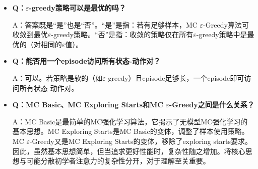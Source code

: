 \documentclass[UTF8]{article}
\begin{document}
\begin{itemize}
    \item \textbf{Q：$\varepsilon$-greedy策略可以是最优的吗？}

    A：答案既是“是”也是“否”。“是”是指：若有足够样本，MC $\varepsilon$-Greedy算法可收敛到最优$\varepsilon$-greedy策略。“否”是指：收敛的策略仅在所有$\varepsilon$-greedy策略中是最优的（对相同的$\varepsilon$值）。

    \item \textbf{Q：能否用一个episode访问所有状态-动作对？}

    A：可以。若策略是软的（如$\varepsilon$-greedy）且episode足够长，一个episode即可访问所有状态-动作对。

    \item \textbf{Q：MC Basic、MC Exploring Starts和MC $\varepsilon$-Greedy之间是什么关系？}

    A：MC Basic是最简单的MC强化学习算法，它揭示了无模型MC强化学习的基本思想。MC Exploring Starts是MC Basic的变体，调整了样本使用策略。MC $\varepsilon$-Greedy又是MC Exploring Starts的变体，移除了exploring starts要求。因此，虽然基本思想简单，但当追求更好性能时，复杂性随之增加。将核心思想与可能分散初学者注意力的复杂性分开，对于理解至关重要。
\end{itemize}
\end{document}
